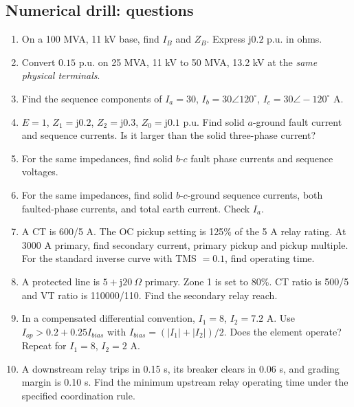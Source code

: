 \documentclass[11pt,a4paper]{article}
\newcommand{\jj}{\mathrm j}
\begin{document}
\subsection{Numerical drill: questions}
\begin{enumerate}[label=\textbf{N\arabic*.}]
\item On a 100 MVA, 11 kV base, find $I_B$ and $Z_B$. Express $\jj0.2$ p.u. in ohms.
\item Convert $0.15$ p.u. on 25 MVA, 11 kV to 50 MVA, 13.2 kV at the \emph{same physical terminals}.
\item Find the sequence components of $I_a=30$, $I_b=30\angle120^\circ$, $I_c=30\angle-120^\circ$ A.
\item $E=1$, $Z_1=\jj0.2$, $Z_2=\jj0.3$, $Z_0=\jj0.1$ p.u. Find solid $a$-ground fault current and sequence currents. Is it larger than the solid three-phase current?
\item For the same impedances, find solid $b$-$c$ fault phase currents and sequence voltages.
\item For the same impedances, find solid $b$-$c$-ground sequence currents, both faulted-phase currents, and total earth current. Check $I_a$.
\item A CT is 600/5 A. The OC pickup setting is 125\% of the 5 A relay rating. At 3000 A primary, find secondary current, primary pickup and pickup multiple. For the standard inverse curve with TMS $=0.1$, find operating time.
\item A protected line is $5+\jj20\ \Omega$ primary. Zone 1 is set to 80\%. CT ratio is 500/5 and VT ratio is 110000/110. Find the secondary relay reach.
\item In a compensated differential convention, $I_1=8$, $I_2=7.2$ A. Use $I_{op}>0.2+0.25I_{bias}$ with $I_{bias}=(|I_1|+|I_2|)/2$. Does the element operate? Repeat for $I_1=8$, $I_2=2$ A.
\item A downstream relay trips in 0.15 s, its breaker clears in 0.06 s, and grading margin is 0.10 s. Find the minimum upstream relay operating time under the specified coordination rule.
\end{enumerate}
\end{document}
